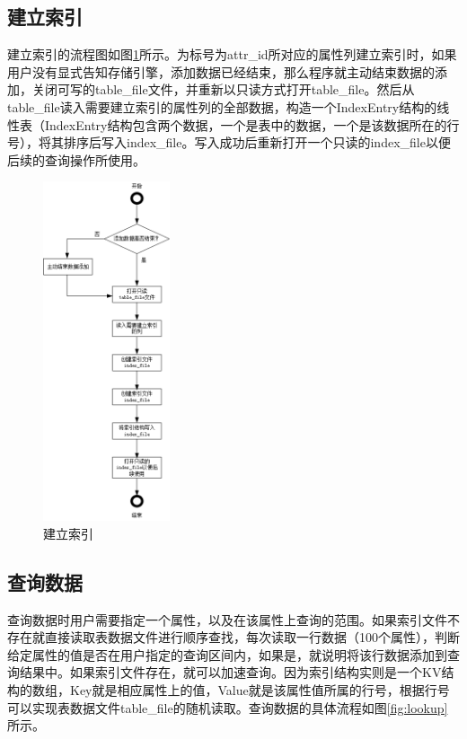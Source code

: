 \documentclass[bachelor]{thesis-uestc}
\begin{document}
\subsection{建立索引}
建立索引的流程图如图\ref{fig:build_index}所示。为标号为attr\_id所对应的属性列建立索引时，如果用户没有显式告知存储引擎，添加数据已经结束，那么程序就主动结束数据的添加，关闭可写的table\_file文件，并重新以只读方式打开table\_file。然后从table\_file读入需要建立索引的属性列的全部数据，构造一个IndexEntry结构的线性表（IndexEntry结构包含两个数据，一个是表中的数据，一个是该数据所在的行号），将其排序后写入index\_file。写入成功后重新打开一个只读的index\_file以便后续的查询操作所使用。

\begin{figure}[htbp]
	\centering\includegraphics[height=10cm]{images/build_index.png}
	\caption{建立索引}
	\label{fig:build_index}
\end{figure}

\subsection{查询数据}
查询数据时用户需要指定一个属性，以及在该属性上查询的范围。如果索引文件不存在就直接读取表数据文件进行顺序查找，每次读取一行数据（100个属性），判断给定属性的值是否在用户指定的查询区间内，如果是，就说明将该行数据添加到查询结果中。如果索引文件存在，就可以加速查询。因为索引结构实则是一个KV结构的数组，Key就是相应属性上的值，Value就是该属性值所属的行号，根据行号可以实现表数据文件table\_file的随机读取。查询数据的具体流程如图\ref{fig:lookup}所示。
\end{document}
